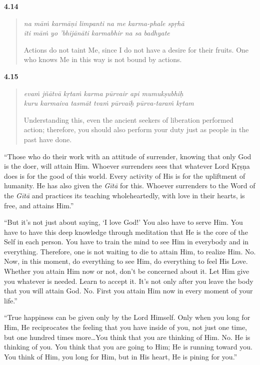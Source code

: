 \par\noindent\textbf{4.14}\par
\begin{verse}
\textit{na māṁ karmāṇi limpanti na me karma-phale spṛhā} \\
\textit{iti māṁ yo ’bhijānāti karmabhir na sa badhyate}

\noindent Actions do not taint Me, since I do not have a desire for their fruits. One who knows Me in this way is not bound by actions.
\end{verse}
\par



\par\noindent\textbf{4.15}\par
\begin{verse}
\textit{evaṁ jñātvā kṛtaṁ karma pūrvair api mumukṣubhiḥ} \\
\textit{kuru karmaiva tasmāt tvaṁ pūrvaiḥ pūrva-taraṁ kṛtam}

\noindent Understanding this, even the ancient seekers of liberation performed action; therefore, you should also perform your duty just as people in the past have done.
\end{verse}
\par


\enquote{Those who do their work with an attitude of surrender, knowing that only God is the doer, will attain Him. Whoever surrenders sees that whatever Lord Kṛṣṇa does is for the good of this world. Every activity of His is for the upliftment of humanity. He has also given the \textit{Gītā} for this. Whoever surrenders to the Word of the \textit{Gītā} and practices its teaching wholeheartedly, with love in their hearts, is free, and attains Him.}

\enquote{But it’s not just about saying, \enquote{I love God!} You also have to serve Him. You have to have this deep knowledge through meditation that He is the core of the Self in each person. You have to train the mind to see Him in everybody and in everything. Therefore, one is not waiting to die to attain Him, to realize Him. No. Now, in this moment, do everything to see Him, do everything to feel His Love. Whether you attain Him now or not, don’t be concerned about it. Let Him give you whatever is needed. Learn to accept it. It’s not only after you leave the body that you will attain God. No. First you attain Him now in every moment of your life.}


\enquote{True happiness can be given only by the Lord Himself. Only when you long for Him, He reciprocates the feeling that you have inside of you, not just one time, but one hundred times more\ldots You think that you are thinking of Him. No. He is thinking of you. You think that you are going to Him; He is running toward you. You think of Him, you long for Him, but in His heart, He is pining for you.}

